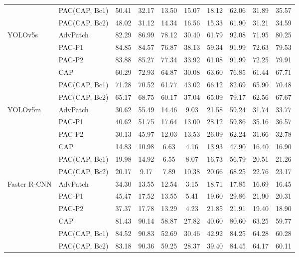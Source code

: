 \begin{table}[t]
{\begin{tabular}{llcccccccc}
 & PAC(CAP, Bc1) & 50.41 & 32.17 & 13.50 & 15.07 & 18.12 & 62.06 & 31.89 & 35.57 \\
 & PAC(CAP, Bc2) & 48.02 & 31.12 & 14.34 & 16.56 & 15.33 & 61.90 & 31.21 & 34.59 \\
\midrule
\multirow{6}{*}{YOLOv5s} & AdvPatch & 82.29 & 86.99 & 78.12 & 30.40 & 61.79 & 92.08 & 71.95 & 80.25 \\
 & PAC-P1 & 84.85 & 84.57 & 76.87 & 38.13 & 59.34 & 91.99 & 72.63 & 79.53 \\
 & PAC-P2 & 83.88 & 85.27 & 77.34 & 33.92 & 61.08 & 91.99 & 72.25 & 79.91 \\
 & CAP & 60.29 & 72.93 & 64.87 & 30.08 & 63.60 & 76.85 & 61.44 & 67.71 \\
 & PAC(CAP, Bc1) & 71.28 & 70.52 & 61.77 & 43.02 & 66.12 & 82.69 & 65.90 & 70.48 \\
 & PAC(CAP, Bc2) & 65.17 & 68.75 & 60.17 & 37.04 & 65.09 & 79.17 & 62.56 & 67.67 \\
\midrule
\multirow{6}{*}{YOLOv5m} & AdvPatch & 30.62 & 55.49 & 14.46 & 9.03 & 21.58 & 59.24 & 31.74 & 33.77 \\
 & PAC-P1 & 40.62 & 51.75 & 17.64 & 13.00 & 28.12 & 59.86 & 35.16 & 36.57 \\
 & PAC-P2 & 30.13 & 45.97 & 12.03 & 13.53 & 26.09 & 62.24 & 31.66 & 32.78 \\
 & CAP & 14.83 & 10.98 & 6.63 & 4.16 & 13.93 & 47.90 & 16.40 & 16.90 \\
 & PAC(CAP, Bc1) & 19.98 & 14.92 & 6.55 & 8.07 & 16.73 & 56.79 & 20.51 & 21.26 \\
 & PAC(CAP, Bc2) & 20.17 & 9.17 & 7.89 & 10.38 & 20.66 & 68.25 & 22.76 & 23.17 \\
\midrule
\multirow{6}{*}{Faster R-CNN} & AdvPatch & 34.30 & 13.55 & 12.54 & 3.15 & 18.71 & 17.85 & 16.69 & 16.45 \\
 & PAC-P1 & 45.47 & 17.52 & 13.55 & 5.41 & 19.60 & 29.86 & 21.90 & 20.31 \\
 & PAC-P2 & 37.37 & 17.78 & 13.29 & 4.23 & 21.85 & 21.91 & 19.40 & 18.90 \\
 & CAP & 81.43 & 90.14 & 58.87 & 27.82 & 40.60 & 80.60 & 63.25 & 59.77 \\
 & PAC(CAP, Bc1) & 84.52 & 90.83 & 52.69 & 30.46 & 42.92 & 84.25 & 64.28 & 60.28 \\
 & PAC(CAP, Bc2) & 83.18 & 90.36 & 59.25 & 28.37 & 39.40 & 84.45 & 64.17 & 60.11 \\
\bottomrule
\end{tabular}}
\end{table}
